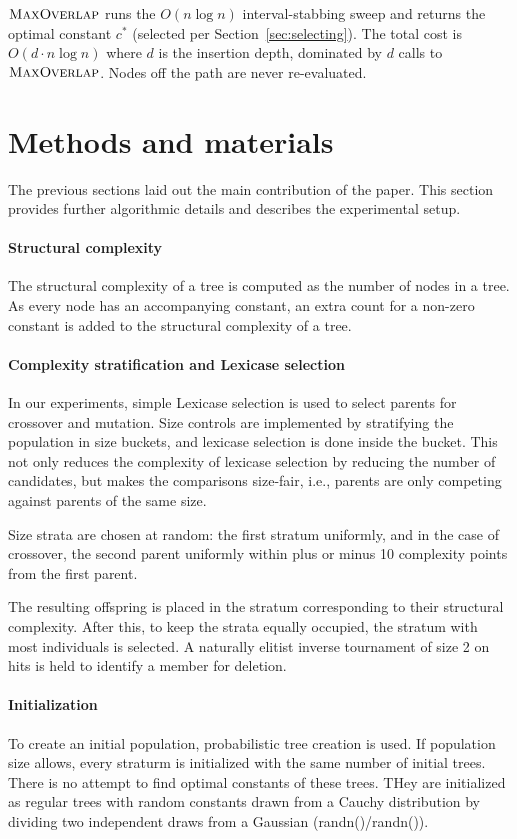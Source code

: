 \documentclass{llncs}
\begin{document}
$\textsc{MaxOverlap}$ runs the $O(n \log n)$ interval-stabbing sweep and returns the optimal constant $c^*$ (selected per Section~\ref{sec:selecting}). The total cost is $O(d \cdot n \log n)$ where $d$ is the insertion depth, dominated by $d$ calls to $\textsc{MaxOverlap}$. Nodes off the path are never re-evaluated.

\section{Methods and materials}

The previous sections laid out the main contribution of the paper. This section provides further algorithmic details and describes the experimental setup.

\paragraph{Structural complexity}
The structural complexity of a tree is computed as the number of nodes in a tree. As every node has an accompanying constant, an extra count for a non-zero constant is added to the structural complexity of a tree.

\paragraph{Complexity stratification and Lexicase selection}

In our experiments, simple Lexicase selection \cite{lexicase} is used to select parents for crossover and mutation. Size controls are implemented by stratifying the population in size buckets, and lexicase selection is done inside the bucket. This not only reduces the complexity of lexicase selection by reducing the number of candidates, but makes the comparisons size-fair, i.e., parents are only competing against parents of the same size.

Size strata are chosen at random: the first stratum uniformly, and in the case of crossover, the second parent uniformly within plus or minus 10 complexity points from the first parent.

The resulting offspring is placed in the stratum corresponding to their structural complexity. After this, to keep the strata equally occupied, the stratum with most individuals is selected. A naturally elitist inverse tournament of size 2 on hits is held to identify a member for deletion. 

\paragraph{Initialization}
To create an initial population, probabilistic tree creation \cite{luke} is used. If population size allows, every straturm is initialized with the same number of initial trees. There is no attempt to find optimal constants of these trees. THey are initialized as regular trees with random constants drawn from a Cauchy distribution by dividing two independent draws from a Gaussian (randn()/randn()).  
\end{document}
